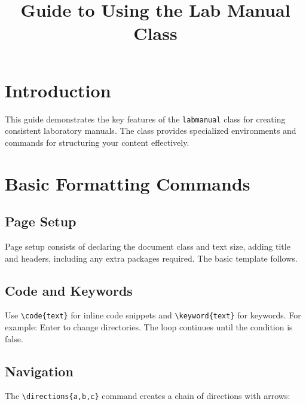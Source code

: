 \documentclass[12pt]{labmanual}
\title{Guide to Using the Lab Manual Class}
\begin{document}
\maketitle
\makeheaders
\clearpage
\tableofcontents
\clearpage
\section{Introduction}

This guide demonstrates the key features of the \texttt{labmanual} class for creating consistent laboratory manuals. The class provides specialized environments and commands for structuring your content effectively.

\section{Basic Formatting Commands}

\subsection{Page Setup}
Page setup consists of declaring the document class and text size, adding title and headers, including any extra packages required. The basic template follows.

\subsection{Code and Keywords}

Use \verb|\code{text}| for inline code snippets and \verb|\keyword{text}| for keywords. For example:
Enter  to change directories. The  loop continues until the condition is false.

\subsection{Navigation}

The \verb|\directions{a,b,c}| command creates a chain of directions with arrows:
\end{document}

